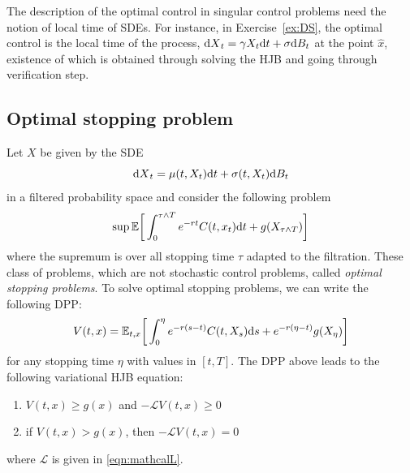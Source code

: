 \documentclass[11pt]{book}
\newcommand{\dd}{\text{\normalfont d}}
\newcommand{\dt}{\text{\normalfont d}t}
\newcommand{\ds}{\text{\normalfont d}s}
\newcommand{\dX}{\text{\normalfont d}X}
\begin{document}
The description of the optimal control in singular control problems need the notion of local time of SDEs. For instance, in Exercise~\ref{ex:DS}, the optimal control is the local time of the process, ${\dX}_t=\gamma X_t{{\dt}}+\sigma {\dd}B_t$ at the point $\hat{x}$, existence of which is obtained through solving the HJB and going through verification step. 
\subsection{Optimal stopping problem}
Let $X$ be given by the SDE
\begin{equation}
    {\dX}_t = \mu(t,X_t){\dt}+\sigma(t,X_t){\dd}B_t
\end{equation}
in a filtered probability space
and consider the following problem
\begin{equation}
    \sup_{}\mathbb{E}\bigg[\int_0^{\tau\wedge T} e^{-rt} C(t,x_t){\dt} + g(X_{\tau\wedge T})\bigg]
\end{equation}
where the supremum is over all stopping time $\tau$ adapted to the filtration. These class of problems, which are not stochastic control problems,  called \emph{optimal stopping problems}. To solve optimal stopping problems, we can write the following DPP:
\begin{equation}
    V(t,x)=\mathbb{E}_{t,x}\bigg[\int_0^{\eta}e^{-r(s-t)}C(t,X_s){\ds}+e^{-r(\eta-t)}g(X_\eta)\bigg]
\end{equation}
for any stopping time $\eta$ with values in $[t,T]$. 
The DPP above leads to the following variational HJB equation:
\begin{enumerate}
    \item $V(t,x)\ge g(x)$ and $-\mathcal{L}V(t,x)\ge0$
    \item if $V(t,x)> g(x)$, then $-\mathcal{L}V(t,x)=0$
\end{enumerate}
where $\mathcal{L}$ is given in \eqref{eqn:mathcalL}.




\end{document}
